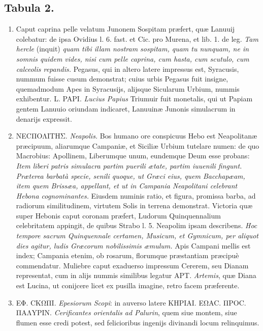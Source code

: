 \documentclass[a4paper, 11pt, oneside, polutonikogreek, latin]{article}
\begin{document}
\subsection*{Tabula 2.}
\begin{enumerate}
    \item Caput caprina pelle velatum Junonem Sospitam præfert, quæ Lanuuij colebatur: de ipsa Ovidius l. 6. fast. et Cic. pro Murena, et lib. 1. de leg. \emph{Tam hercle} (inquit) \emph{quam tibi illam nostram sospitam, quam tu nunquam, ne in somnis quidem vides, nisi cum pelle caprina, cum hasta, cum scutulo, cum calceolis repandis.} Pegasus, qui in altero latere impressus est, Syracusis, nummum fuisse cusum demonstrat; cuius urbis Pegasus fuit insigne, quemadmodum Apes in Syracusijs, alijsque Sicularum Urbium, nummis exhibentur. L. PAPI. \emph{Lucius Papius} Triumuir fuit monetalis, qui ut Papiam gentem Lanuuio oriundam indicaret, Lanuuinæ Junonis simulacrum in denarijs expressit.

    \item NECΠOΛITHΣ. \emph{Neapolis.} Bos humano ore conspicuus Hebo est Neapolitanæ præcipuum, aliarumque Campaniæ, et Siciliæ Urbium tutelare numen: de quo Macrobius: Apollinem, Liberumque unum, eundemque Deum esse probans: \emph{Item liberi patris simulacra partim puerili ætate, partim iuuenili fingunt. Præterea barbatà specie, senili quoque, ut Græci eius, quem Bacchapæam, item quem Brissæa, appellant, et ut in Campania Neapolitani celebrant Hebona cognominantes.} Eiusdem numinis ratio, et figura, promissa barba, ad radiorum similitudinem, virtutem Solis in terrena demonstrat. Victoria quæ super Hebonis caput coronam præfert, Ludorum Quinquennalium celebritatem appingit, de quibus Strabo l. 5. Neapolim ipsam describens. \emph{Hoc tempore sacrum Quinquennale certamen, Musicum, et Gymnicum, per aliquot dies agitur, ludis Græcorum nobilissimis æmulum.} Apis Campani mellis est index; Campania etenim, ob rosarum, florumque præstantiam præcipuè commendatur. Muliebre caput exaduerso impressum Cererem, seu Dianam representat, cum in alijs nummis similibus legatur APT. \emph{Artemis}, quæ Diana est Lucina, ut conijcere licet ex pusilla imagine, retro facem præferente.

    \item EΦ. CKΩΠI. \emph{Epesiorum Scopi}: in auverso latere KHPIAI. EΩAC. ΠPOC. ΠAΛYPIN. \emph{Cerificantes orientalis ad Palurin}, quem siue montem, siue flumen esse credi potest, sed felicioribus ingenijs divinandi locum relinquimus.


\end{enumerate}
\end{document}
